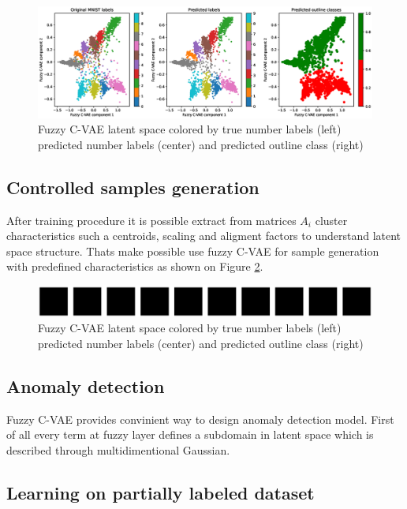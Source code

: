 \documentclass[runningheads]{llncs}
\begin{document}
\begin{figure}[h]  
    \centering
    \includegraphics[width=1\textwidth]{fig3-fcvae-classification.eps}
    \caption{Fuzzy C-VAE latent space colored by true number labels (left) predicted number labels (center) and predicted outline class (right) }
    \label{fig:fcvae-classes}
\end{figure}

\subsection{Controlled samples generation}

After training procedure it is possible extract from matrices $A_i$ cluster characteristics such a centroids, scaling and aligment factors to understand latent space structure.
Thats make possible use fuzzy C-VAE for sample generation with predefined characteristics as shown on Figure \ref{fig:samples-generation}.

\begin{figure}[h]  
    \centering
    \includegraphics[width=1\textwidth]{fig4-sample-generation.eps}
    \caption{Fuzzy C-VAE latent space colored by true number labels (left) predicted number labels (center) and predicted outline class (right) }
    \label{fig:samples-generation}
\end{figure}

\subsection{Anomaly detection}

Fuzzy C-VAE provides convinient way to design anomaly detection model.
First of all every term at fuzzy layer defines a subdomain in latent space which is described through multidimentional Gaussian.



\subsection{Learning on partially labeled dataset}
\end{document}
